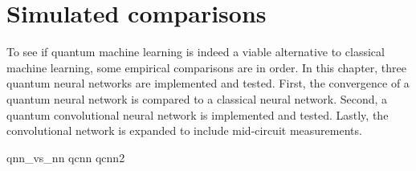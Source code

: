 \chapter{Simulated comparisons}
\label{chap:comparison}

To see if quantum machine learning is indeed a viable alternative to classical machine learning, some empirical comparisons are in order.
In this chapter, three quantum neural networks are implemented and tested.
First, the convergence of a quantum neural network is compared to a classical neural network.
Second, a quantum convolutional neural network is implemented and tested.
Lastly, the convolutional network is expanded to include mid-circuit measurements.

{qnn_vs_nn}
{qcnn}
{qcnn2}
